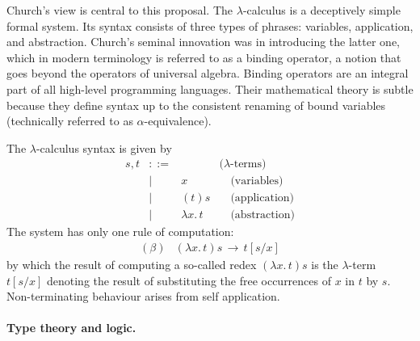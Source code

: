 \documentclass[11pt,twocolumn]{article}
\newcommand{\hide}[1]{}
\newcommand{\pref}[1]{\,(\ref{#1})}
\newcommand{\lcalculus}{\mbox{$\lambda$-calculus}}
\begin{document}
Church's view is central to this proposal.  The {\lcalculus} is a
deceptively simple formal system.  Its syntax consists of three types of
phrases: variables, application, and abstraction.  Church's seminal
innovation was in introducing the latter one, 
which in modern terminology is referred to as a binding operator, a notion
that goes beyond the operators of universal algebra. %
Binding operators are an integral part of all high-level  programming
languages.  Their mathematical theory is subtle %
because they define syntax up to the consistent renaming of bound
variables (technically referred to as \mbox{$\alpha$-equivalence}).
\hide{
This subtlety is made evident by the anecdotal fact that the first definitions
of substitution were formally flawed.}

\hide{
Incidentally, the notion of variable binding was initially introduced much
earlier, by Frege~\cite{Frege1879}, in the context of mathematical logic.  
He used binders to define a formal symbolic
system axiomatising not only the propositional connectives of Boolean
logic~\cite{Boole} but also, for the first time, the quantifiers of
predicate logic.
}

The %
{\lcalculus} syntax is given by
  \[\begin{array}{rcll}
    s , t & ::= & & \mbox{($\lambda$-terms)}\\
      & \mid & x & \quad\mbox{(variables)}\\
      & \mid & (t)s & \quad\mbox{(application)}\\
      & \mid & \lambda x.\,t & \quad\mbox{(abstraction)}
  \end{array}\]
The system has only one rule of computation:
  \begin{equation}\label{BetaReduction}\begin{array}{rl}
(\beta) & (\lambda x.\,t)s \,\longrightarrow\, t[s/x]
  \end{array}\end{equation}
by which the result of computing a so-called redex $(\lambda x.\,t)s$ is
the \mbox{$\lambda$-term} $t[s/x]$ denoting the result of substituting the
free occurrences of $x$ in $t$ by $s$.  Non-terminating behaviour arises from
self application.

\paragraph{Type theory and logic.}
\label{SectionATypeTheoryAndLogicParagraph}
\end{document}
